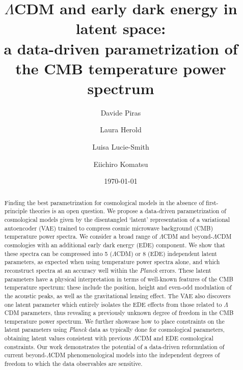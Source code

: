 \documentclass[aps, prd, reprint, superscriptaddress, nofootinbib, bibnotes]{revtex4-2}
\newcommand{\Planck}{\textit{Planck}}
\begin{document}
\title{$\Lambda$CDM and early dark energy in latent space:\\a data-driven parametrization of the CMB temperature power spectrum}

\author{Davide Piras}

\author{Laura Herold}

\author{Luisa Lucie-Smith}
\author{Eiichiro Komatsu}

\date{\today}

\begin{abstract}
Finding the best parametrization for cosmological models in the absence of first-principle theories is an open question.
We propose a data-driven parametrization of cosmological models given by the disentangled `latent' representation of a variational autoencoder (VAE) trained to compress cosmic microwave background (CMB) temperature power spectra. We consider a broad range of $\Lambda$CDM and beyond-$\Lambda$CDM cosmologies with an additional early dark energy (EDE) component. We show that these spectra can be compressed into 5 ($\Lambda$CDM) or 8 (EDE) independent latent parameters, as expected when using temperature power spectra alone, and which reconstruct spectra at an accuracy well within the \Planck{} errors. These latent parameters have a physical interpretation in terms of well-known features of the CMB temperature spectrum: these include the position, height and even-odd modulation of the acoustic peaks, as well as the gravitational lensing effect. The VAE also discovers one latent parameter which entirely isolates the EDE effects from those related to $\Lambda$CDM parameters, thus revealing a previously unknown degree of freedom in the CMB temperature power spectrum.
We further showcase how to place constraints on the latent parameters using \Planck{} data as typically done for cosmological parameters, obtaining latent values consistent with previous $\Lambda$CDM and EDE cosmological constraints. Our work demonstrates the potential of a data-driven reformulation of current beyond-$\Lambda$CDM phenomenological models into the independent degrees of freedom to which the data observables are sensitive.
\end{abstract}
\end{document}
